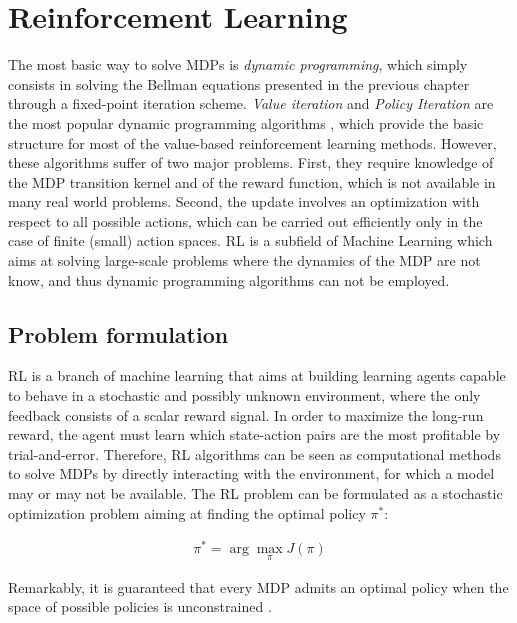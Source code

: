 \section{Reinforcement Learning}
The most basic way to solve \gls{MDP}s is \emph{dynamic programming}, which simply consists in solving the Bellman equations presented in the previous chapter through a fixed-point iteration scheme. \emph{Value iteration} and \emph{Policy Iteration} are the most popular dynamic programming algorithms \cite{sutton2018reinforcement}, which provide the basic structure for most of the value-based reinforcement learning methods. However, these algorithms suffer of two major problems. First, they require knowledge of the \gls{MDP} transition kernel and of the reward function, which is not available in many real world problems. Second, the update involves an optimization with respect to all possible actions, which can be carried out efficiently only in the case of finite (small) action spaces. 
\gls{RL} is a subfield of Machine Learning which aims at solving large-scale problems where the dynamics of the \gls{MDP} are not know, and thus dynamic programming algorithms can not be employed. 

\subsection{Problem formulation}
\gls{RL} is a branch of machine learning that aims at building learning agents capable to behave in a stochastic and possibly unknown environment, where the only feedback consists of a scalar reward signal. In order to maximize the long-run reward, the agent must learn which state-action pairs are the most profitable by trial-and-error. Therefore, \gls{RL} algorithms can be seen as computational methods to solve \gls{MDP}s by directly interacting with the environment, for which a model may or may not be available. The \gls{RL} problem can be formulated as a stochastic optimization problem aiming at finding the optimal policy $\pi^{*}$:

\begin{align}
\pi^* = \arg \max_{\pi} J(\pi) \label{eq:optimalpolicy}
\end{align}

Remarkably, it is guaranteed that every \gls{MDP} admits an optimal policy when the space of possible policies is unconstrained  \cite{puterman2014markov}.

